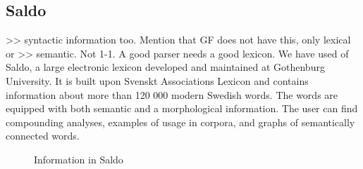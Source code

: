 \documentclass{report}
\begin{document}
\subsection{Saldo}
>> syntactic information too. Mention that GF does not have this, only lexical or
>> semantic. Not 1-1.
A good parser needs a good lexicon. We have used of Saldo\cite{saldo}, a
large electronic lexicon developed and maintained at Gothenburg University. It is
built upon Svenskt Associations Lexicon and contains information about more than 
120 000 modern Swedish words.
The words are equipped with both semantic and a morphological
information. The user can find compounding analyses, examples of usage in corpora,
and graphs of semantically connected words.\\
\newpage %
\begin{figure}[h!]
\centering
{}
\hspace{20mm}
\caption{Information in Saldo}
\label{fig:saldo}
\end{figure}
\end{document}
